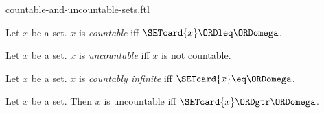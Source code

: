 \documentclass{naproche-library}
\begin{document}
\begin{smodule}[title=Countable and Uncountable Sets]{countable-and-uncountable-sets.ftl}

\begin{definition}[forthel,id=SET_THEORY_07_8808604616359936]
  Let $x$ be a set.
  $x$ is \emph{countable} iff $\SETcard{x} \ORDleq \ORDomega$.
\end{definition}

\begin{definition}[forthel,id=SET_THEORY_07_2935263915409408]
  Let $x$ be a set.
  $x$ is \emph{uncountable} iff $x$ is not countable.
\end{definition}

\begin{definition}[forthel,id=SET_THEORY_07_5679866426949632]
  Let $x$ be a set.
  $x$ is \emph{countably infinite} iff $\SETcard{x} \eq \ORDomega$.
\end{definition}

\begin{proposition}[forthel,id=SET_THEORY_07_4281623468048384]
  Let $x$ be a set.
  Then $x$ is uncountable iff $\SETcard{x} \ORDgtr \ORDomega$.
\end{proposition}
\end{smodule}
\end{document}

